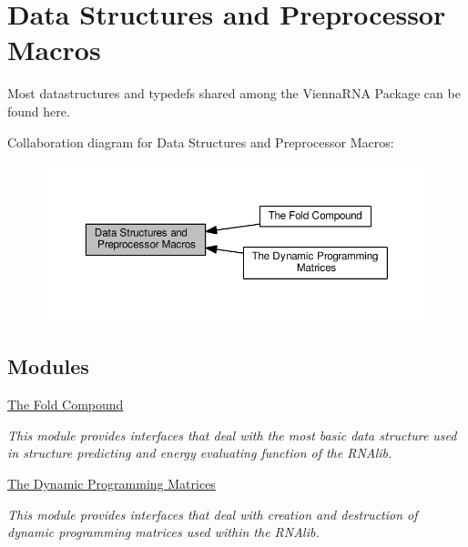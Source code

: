 \hypertarget{group__data__structures}{}\section{Data Structures and Preprocessor Macros}
\label{group__data__structures}


Most datastructures and typedefs shared among the Vienna\+R\+NA Package can be found here.  


Collaboration diagram for Data Structures and Preprocessor Macros\+:
\nopagebreak
\begin{figure}[H]
\begin{center}
\leavevmode
\includegraphics[width=350pt]{group__data__structures}
\end{center}
\end{figure}
\subsection*{Modules}
\begin{DoxyCompactItemize}
\item 
\hyperlink{group__fold__compound}{The Fold Compound}
\begin{DoxyCompactList}\small\item\em This module provides interfaces that deal with the most basic data structure used in structure predicting and energy evaluating function of the R\+N\+Alib. \end{DoxyCompactList}\item 
\hyperlink{group__dp__matrices}{The Dynamic Programming Matrices}
\begin{DoxyCompactList}\small\item\em This module provides interfaces that deal with creation and destruction of dynamic programming matrices used within the R\+N\+Alib. \end{DoxyCompactList}\end{DoxyCompactItemize}
